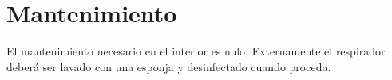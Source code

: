 \section{Mantenimiento}
    El mantenimiento necesario en el interior es nulo. Externamente el respirador deberá ser lavado con una esponja y desinfectado cuando proceda. 